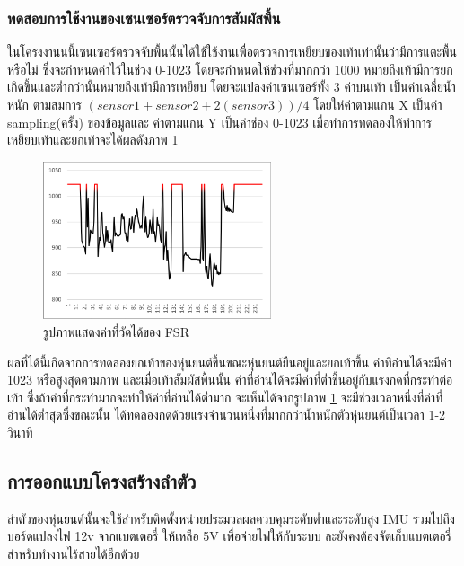 \subsubsection{ทดสอบการใช้งานของเซนเซอร์ตรวจจับการสัมผัสพื้น}
ในโครงงานนนี้เซนเซอร์ตรวจจับพื้นนั้นได้ใช้ใช้งานเพื่อตรวจการเหยียบของเท้าเท่านั้นว่ามีการแตะพื้นหรือไม่ ซึ่งจะกำหนดค่าไว้ในช่วง 
0-1023 โดยจะกำหนดให้ช่วงที่มากกว่า 1000 หมายถึงเท้ามีการยกเกิดขึ้นและต่ำกว่านั้นหมายถึงเท้ามีการเหยียบ โดยจะแปลงค่าเซนเซอร์ทั้ง 3 ค่าบนเท้า
เป็นค่าเฉลี่ยน้ำหนัก ตามสมการ $(sensor1 + sensor 2 + 2(sensor3))/4$ โดยให่ค่าตามแกน X เป็นค่า sampling(ครั้ง) ของข้อมูลและ
ค่าตามแกน Y เป็นค่าช่อง 0-1023 เมื่อทำการทดลองให้ทำการเหยียบเท้าและยกเท้าจะได้ผลดังภาพ \ref{fig:FSR_graph}

\begin{figure}[!ht]
  \centering
  \includegraphics[width=0.6\textwidth]{chapter4/images/FSR_graph.PNG}
  \caption{รูปภาพแสดงค่าที่วัดได้ของ FSR}
  \label{fig:FSR_graph}
\end{figure}
ผลที่ได้นี้เกิดจากการทดลองยกเท้าของหุ่นยนต์ขึ้นขณะหุ่นยนต์ยืนอยู่และยกเท้าขึ้น ค่าที่อ่านได้จะมีค่า 1023 หรือสูงสุดตามภาพ และเมื่อเท้าสัมผัสพื้นนั้น
ค่าที่อ่านได้จะมีค่าที่ต่ำขึ้นอยู่กับแรงกดที่กระทำต่อเท้า ซึ่งถ้าค่าที่กระทำมากจะทำให้ค่าที่อ่านได้ต่ำมาก จะเห็นได้จากรูปภาพ \ref{fig:FSR_graph} 
จะมีช่วงเวลาหนึ่งที่ค่าที่อ่านได้ต่ำสุดซึ่งขณะนั้น ได้ทดลองกดด้วยแรงจำนวนหนึ่งที่มากกว่าน้ำหนักตัวหุ่นยนต์เป็นเวลา 1-2 วินาที


\clearpage
\subsection{การออกแบบโครงสร้างลำตัว}
ลำตัวของหุ่นยนต์นั้นจะใช้สำหรับติดตั้งหน่วยประมวลผลควบคุมระดับต่ำและระดับสูง IMU รวมไปถึงบอร์ดแปลงไฟ 12v จากแบตเตอรี่
ให้เหลือ 5V เพื่อจ่ายไฟให้กับระบบ ละยังคงต้องจัดเก็บแบตเตอรี่สำหรับทำงานไร้สายได้อีกด้วย 
